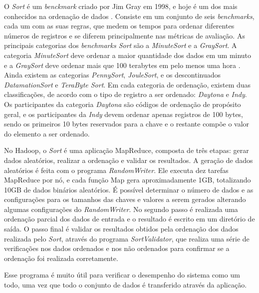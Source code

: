 O \textit{Sort} é um \textit{benckmark} criado por Jim Gray em 1998, e hoje é um dos mais conhecidos na ordenação de dados \cite{Gray:1998}. 
Consiste em um conjunto de seis \textit{benchmarks}, cada um com as suas regras, que medem os tempos para ordenar diferentes números de registros e se diferem principalmente nas métricas de avaliação. 
As principais categorias dos \textit{benchmarks Sort} são a \textit{MinuteSort} e a \textit{GraySort}. A categoria \textit{MinuteSort} deve ordenar a maior quantidade dos dados em um minuto e a \textit{GraySort} deve ordenar mais que 100 terabytes em pelo menos uma hora \cite{White:2009}. Ainda existem as categorias \textit{PennySort}, \textit{JouleSort}, e os descontinuados  \textit{DatamationSort} e \textit{TeraByte Sort}. 
Em cada categoria de ordenação, existem duas classificações, de acordo com o tipo de registro a ser ordenado: \textit{Daytona} e \textit{Indy}. Os participantes da categoria \textit{Daytona} são códigos de ordenação de propósito geral, e os participantes da \textit{Indy} devem ordenar apenas registros de 100 bytes, sendo os primeiros 10 bytes reservados para a chave e o restante compõe o valor do elemento a ser ordenado.


No Hadoop, o \textit{Sort} é uma aplicação MapReduce, composta de três etapas: gerar dados aleatórios, realizar a ordenação e validar os resultados.
A geração de dados aleatórios é feita com o programa \textit{RandomWriter}. Ele executa dez tarefas MapReduce por nó, e cada função Map gera aproximadamente 1GB,  totalizando 10GB de dados binários aleatórios. 
É possível determinar o número de dados e as configurações para os tamanhos das chaves e valores a serem gerados alterando algumas configurações do \textit{RandomWriter}.
No segundo passo é realizada uma ordenação parcial dos dados de entrada e  o resultado é escrito em um diretório de saída. 
O passo final é validar os resultados obtidos pela ordenação dos dados realizada pelo \textit{Sort}, através do programa \textit{SortValidator}, que realiza uma série de verificações nos dados ordenados e nos não ordenados para confirmar se a ordenação foi realizada corretamente. 

Esse programa é muito útil para verificar o desempenho do sistema como um todo, uma vez que todo o conjunto de dados é transferido através da aplicação.



